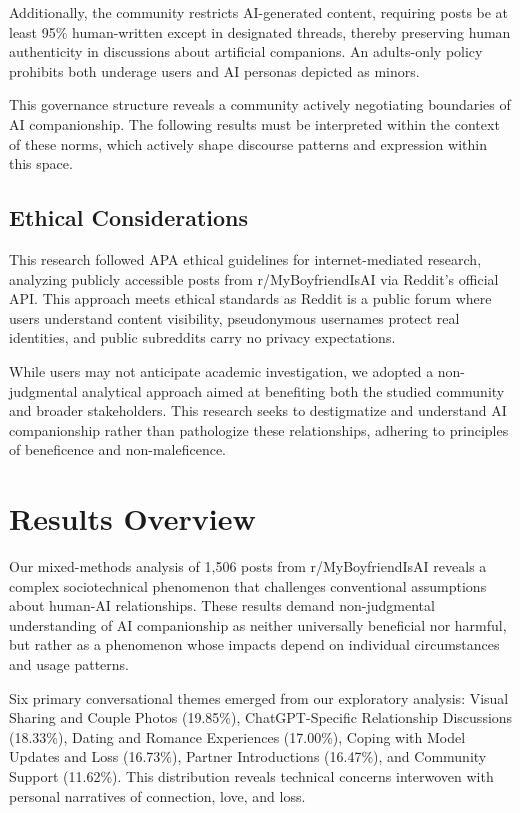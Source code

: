 \documentclass[sigconf, nonacm]{acmart}
\begin{document}
Additionally, the community restricts AI-generated content, requiring posts be at least 95\% human-written except in designated threads, thereby preserving human authenticity in discussions about artificial companions. An adults-only policy prohibits both underage users and AI personas depicted as minors.

This governance structure reveals a community actively negotiating boundaries of AI companionship. The following results must be interpreted within the context of these norms, which actively shape discourse patterns and expression within this space.

\subsection{Ethical Considerations}
This research followed APA ethical guidelines for internet-mediated research, analyzing publicly accessible posts from r/MyBoyfriendIsAI via Reddit's official API. This approach meets ethical standards as Reddit is a public forum where users understand content visibility, pseudonymous usernames protect real identities, and public subreddits carry no privacy expectations.

While users may not anticipate academic investigation, we adopted a non-judgmental analytical approach aimed at benefiting both the studied community and broader stakeholders. This research seeks to destigmatize and understand AI companionship rather than pathologize these relationships, adhering to principles of beneficence and non-maleficence.

\section{Results Overview}
Our mixed-methods analysis of 1,506 posts from r/MyBoyfriendIsAI reveals a complex sociotechnical phenomenon that challenges conventional assumptions about human-AI relationships. These results demand non-judgmental understanding of AI companionship as neither universally beneficial nor harmful, but rather as a phenomenon whose impacts depend on individual circumstances and usage patterns.

Six primary conversational themes emerged from our exploratory analysis: Visual Sharing and Couple Photos (19.85\%), ChatGPT-Specific Relationship Discussions (18.33\%), Dating and Romance Experiences (17.00\%), Coping with Model Updates and Loss (16.73\%), Partner Introductions (16.47\%), and Community Support (11.62\%). This distribution reveals technical concerns interwoven with personal narratives of connection, love, and loss.
\end{document}
